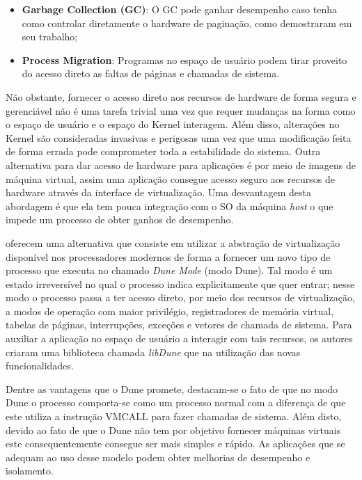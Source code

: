 \begin{itemize}
  \item \textbf{Garbage Collection (GC)}: O GC pode ganhar desempenho caso
        tenha como controlar diretamente o hardware de paginação, como
        \cite{pauseless} demostraram em seu trabalho;
  \item \textbf{Process Migration}: Programas no espaço de usuário podem tirar
        proveito do acesso direto as faltas de páginas e chamadas de sistema.
\end{itemize}

Não obstante, fornecer o acesso direto aos recursos de hardware de forma segura
e gerenciável não é uma tarefa trivial uma vez que requer mudanças na forma
como o espaço de usuário e o espaço do Kernel interagem. Além disso, alterações
no Kernel são consideradas invasivas e perigosas uma vez que uma modificação
feita de forma errada pode comprometer toda a estabilidade do sistema. Outra
alternativa para dar acesso de hardware para aplicações é por meio de imagens
de máquina virtual, assim uma aplicação consegue acesso seguro aos recursos de
hardware através da interface de virtualização. Uma desvantagem desta abordagem
é que ela tem pouca integração com o SO da máquina \emph{host} o que impede um
processo de obter ganhos de desempenho.

\cite{belay} oferecem uma alternativa que consiste em utilizar a abstração de
virtualização disponível nos processadores modernos de forma a fornecer um novo
tipo de processo que executa no chamado \emph{Dune Mode} (modo Dune). Tal modo
é um estado irreversível no qual o processo indica explicitamente que quer
entrar; nesse modo o processo passa a ter acesso direto, por meio dos recursos
de virtualização, a modos de operação com maior privilégio, registradores de
memória virtual, tabelas de páginas, interrupções, exceções e vetores de
chamada de sistema. Para auxiliar a aplicação no espaço de usuário a interagir
com tais recursos, os autores criaram uma biblioteca chamada \emph{libDune} que
na utilização das novas funcionalidades.

Dentre as vantagens que o Dune promete, destacam-se o fato de que no modo Dune
o processo comporta-se como um processo normal com a diferença de que este
utiliza a instrução VMCALL para fazer chamadas de sistema. Além disto, devido
ao fato de que o Dune não tem por objetivo fornecer máquinas virtuais este
consequentemente consegue ser mais simples e rápido. As aplicações que se
adequam ao uso desse modelo podem obter melhorias de desempenho e isolamento.

